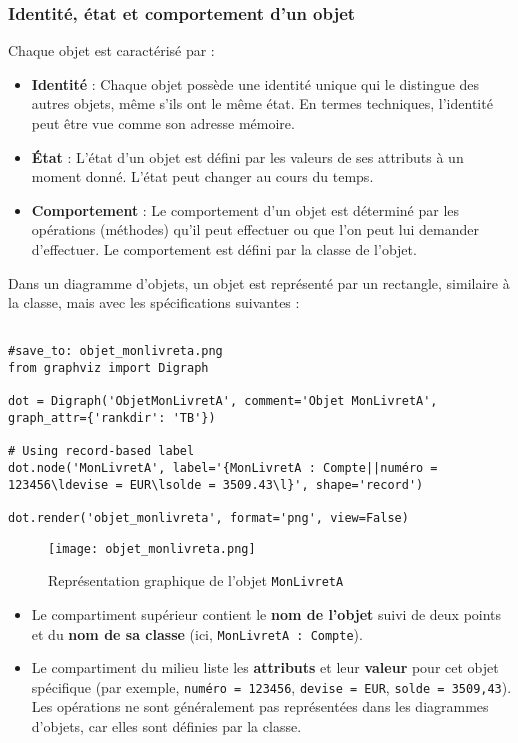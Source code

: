 \documentclass{article}
\begin{document}
\subsubsection{Identité, état et comportement d'un objet}
Chaque objet est caractérisé par :
\begin{itemize}
    \item \textbf{Identité} : Chaque objet possède une identité unique qui le distingue des autres objets, même s'ils ont le même état. En termes techniques, l'identité peut être vue comme son adresse mémoire.
    \item \textbf{État} : L'état d'un objet est défini par les valeurs de ses attributs à un moment donné. L'état peut changer au cours du temps.
    \item \textbf{Comportement} : Le comportement d'un objet est déterminé par les opérations (méthodes) qu'il peut effectuer ou que l'on peut lui demander d'effectuer. Le comportement est défini par la classe de l'objet.
\end{itemize}

Dans un diagramme d'objets, un objet est représenté par un rectangle, similaire à la classe, mais avec les spécifications suivantes :

\begin{verbatim}

#save_to: objet_monlivreta.png
from graphviz import Digraph

dot = Digraph('ObjetMonLivretA', comment='Objet MonLivretA', graph_attr={'rankdir': 'TB'})

# Using record-based label
dot.node('MonLivretA', label='{MonLivretA : Compte||numéro = 123456\ldevise = EUR\lsolde = 3509.43\l}', shape='record')

dot.render('objet_monlivreta', format='png', view=False)

\end{verbatim}

\begin{figure}[h]
    \centering
    \texttt{[image: objet\_monlivreta.png]}
    \caption{Représentation graphique de l'objet \texttt{MonLivretA}}
    \label{fig:objet_monlivreta}
\end{figure}


\begin{itemize}
    \item Le compartiment supérieur contient le \textbf{nom de l'objet} suivi de deux points et du \textbf{nom de sa classe} (ici, \texttt{MonLivretA : Compte}).
    \item Le compartiment du milieu liste les \textbf{attributs} et leur \textbf{valeur} pour cet objet spécifique (par exemple, \texttt{numéro = 123456}, \texttt{devise = EUR}, \texttt{solde = 3509,43}).  Les opérations ne sont généralement pas représentées dans les diagrammes d'objets, car elles sont définies par la classe.
\end{itemize}
\end{document}

